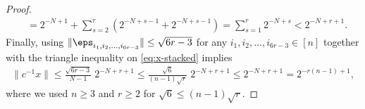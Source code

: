 \begin{proof}
\begin{align*}
	&= 2^{-N+1} + \sum_{s=2}^r \left( 2^{-N+s-1} + 2^{-N+s-1} \right)
	= \sum_{s=1}^r 2^{-N+s} < 2^{-N + r + 1}.
	\end{align*}
Finally, using $\| \eps_{i_1, i_2, \ldots, i_{6 r  -3}} \| \leq \sqrt{6 r - 3}$ for any $i_1, i_2, \ldots,i_{6r - 3} \in [n]$ together with the triangle inequality on \cref{eq:x-stacked} implies
	\begin{align*}
	\| c^{-1} x\| \leq \frac{\sqrt{6 r - 3}}{N - 1} \; 2^{-N + r + 1}
	\leq \frac{\sqrt{6}}{(n-1)\sqrt{r}} \; 2^{-N + r + 1} \leq 2^{-N + r + 1} = 2^{- r (n-1) + 1},
	\end{align*}
where we used $n \geq 3$ and $r \geq 2$ for $\sqrt{6} \leq (n-1) \sqrt{r}$.
\end{proof}






















































































